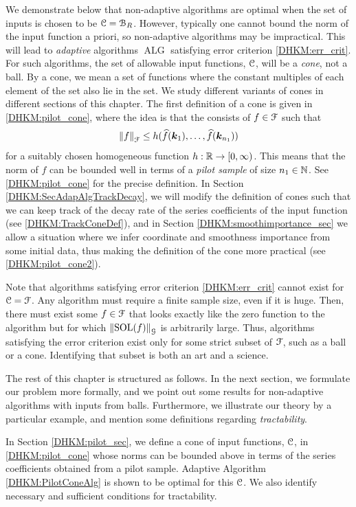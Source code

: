 \documentclass[USenglish]{article}
\theoremstyle{dgthm}
\theoremstyle{dgthm}
\theoremstyle{dgthm}
\theoremstyle{dgthm}
\theoremstyle{dgdef}
\theoremstyle{definition}
\DeclareMathOperator{\SOL}{SOL}
\DeclareMathOperator{\ALG}{ALG}
\newcommand{\hf}{\widehat{f}}
\newcommand{\norm}[2][{}]{\ensuremath{\left \lVert #2 \right \rVert}_{#1}}
\begin{document}
{We demonstrate below that non-adaptive algorithms are optimal when the set of inputs is chosen to be ${\mathcal{C}} = {\mathcal{B}}_R$. However, typically one cannot bound the norm of the input function a priori, so non-adaptive algorithms may be impractical. 
This will lead to \emph{adaptive} algorithms $\ALG$ satisfying error criterion \eqref{DHKM:err_crit}.  For such algorithms, the set of allowable input functions, ${\mathcal{C}}$, will be a \emph{cone}, not a ball. By a cone, we mean a set of functions where the constant multiples of each element of the set also lie in the set. We study different variants of cones in different sections of this chapter. The first definition of a cone is given in \eqref{DHKM:pilot_cone}, 
where the idea is that the consists of $f\in{\mathcal{F}}$ such that 
$$
  \norm[\calF]{f}\le h (\hf(\bsk_1),\ldots,\hf (\bsk_{n_1}))
$$
for a suitably chosen homogeneous function $h:{\mathbb{R}}\rightarrow [0,\infty)$. This means that the norm of $f$ can be bounded well in terms of 
a \emph{pilot sample} of size $n_1\in{\mathbb{N}}$. See \eqref{DHKM:pilot_cone} for the precise definition. In Section \ref{DHKM:SecAdapAlgTrackDecay}, we will modify the definition of cones such that we can keep track of the decay rate of the series coefficients of the input function (see \eqref{DHKM:TrackConeDef}), 
and in Section \ref{DHKM:smoothimportance_sec} we allow a situation 
where we infer coordinate and smoothness importance from some initial data, thus making the definition of the cone more practical (see  
\eqref{DHKM:pilot_cone2}).

Note that algorithms satisfying error criterion \eqref{DHKM:err_crit} cannot exist for ${\mathcal{C}} = {\mathcal{F}}$. Any algorithm must require a finite sample size, even if it is huge.  Then, there must exist some $f \in {\mathcal{F}}$ that looks exactly like the zero function to the algorithm but for which $\norm[\calG]{\SOL(f)}$ is arbitrarily large.  Thus, algorithms satisfying the error criterion  exist only for some strict subset of ${\mathcal{F}}$, such as a ball or a cone.  Identifying that subset is both an art and a science.


The rest of this chapter is structured as follows. In the next section, we formulate our problem more formally, and we point out some results for non-adaptive algorithms with inputs from balls. Furthermore, we illustrate our theory by 
a particular example, and mention some definitions regarding \emph{tractability}. 


In Section \ref{DHKM:pilot_sec}, we define a cone of input functions, ${\mathcal{C}}$, in \eqref{DHKM:pilot_cone} whose norms can be bounded above in terms of the series coefficients obtained from a pilot sample.  Adaptive Algorithm \ref{DHKM:PilotConeAlg} is shown to be optimal for this ${\mathcal{C}}$.  We also identify necessary and sufficient conditions for tractability.

}
\end{document}
